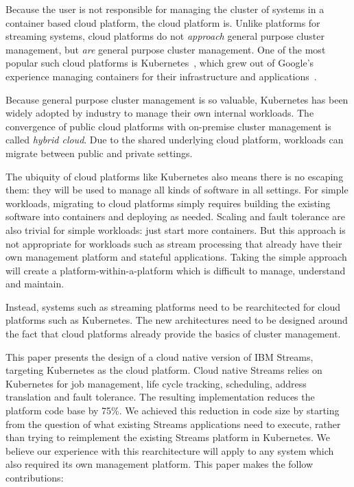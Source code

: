 Because the user is not responsible for managing the cluster of systems in a
container based cloud platform, the cloud platform is. Unlike platforms
for streaming systems, cloud platforms do not \emph{approach} general purpose
cluster management, but \emph{are} general purpose cluster management. One of
the most popular such cloud platforms is Kubernetes~\cite{kube}, which grew out
of Google's experience managing containers for their infrastructure and
applications~\cite{borg-omega-kube-2016}.

Because general purpose cluster management is so valuable, Kubernetes has been
widely adopted by industry to manage their own internal workloads. The
convergence of public cloud platforms with on-premise cluster management is
called \emph{hybrid cloud}. Due to the shared underlying cloud platform,
workloads can migrate between public and private settings.

The ubiquity of cloud platforms like Kubernetes also means there is no escaping
them: they will be used to manage all kinds of software in all settings. For
simple workloads, migrating to cloud platforms simply requires building the
existing software into containers and deploying as needed. Scaling and fault
tolerance are also trivial for simple workloads: just start more containers. But
this approach is not appropriate for workloads such as stream processing that
already have their own management platform and stateful applications. Taking the
simple approach will create a platform-within-a-platform which is difficult to
manage, understand and maintain.

Instead, systems such as streaming platforms need to be rearchitected for cloud 
platforms such as Kubernetes. The new architectures need to be designed around 
the fact that cloud platforms already provide the basics of cluster management.

This paper presents the design of a cloud native version of IBM Streams,
targeting Kubernetes as the cloud platform. Cloud native Streams relies on
Kubernetes for job management, life cycle tracking, scheduling, address
translation and fault tolerance.  The resulting implementation reduces the
platform code base by 75\%. We achieved this reduction in code size by
starting from the question of what existing Streams applications need to
execute, rather than trying to reimplement the existing Streams platform in
Kubernetes. We believe our experience with this rearchitecture will apply to any
system which also required its own management platform. This paper makes the
follow contributions:

